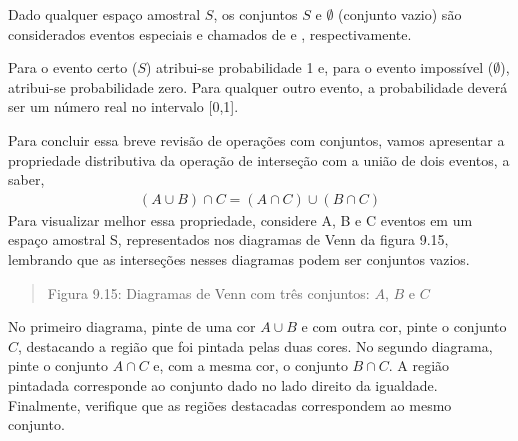Dado qualquer espaço amostral \(S\), os conjuntos \(S\) e \(\emptyset\) (conjunto vazio) são considerados eventos especiais e chamados de  e , respectivamente.

Para o evento certo (\(S\)) atribui-se probabilidade 1 e, para o evento impossível (\(\emptyset\)), atribui-se probabilidade zero. Para qualquer outro evento, a probabilidade deverá ser um número real no intervalo {[}0,1{]}.

Para concluir essa breve revisão de operações com conjuntos, vamos apresentar a propriedade distributiva da operação de interseção com a união de dois eventos, a saber,
\begin{equation*}
\begin{split}(A\cup B)\cap C=(A\cap C)\cup (B\cap C)\end{split}
\end{equation*}
Para visualizar melhor essa propriedade, considere A, B e C eventos em um espaço amostral S, representados nos diagramas de Venn da figura 9.15, lembrando que as interseções nesses diagramas podem ser conjuntos vazios.
\begin{quote}
\begin{center}\end{center}\begin{center}\end{center}
Figura 9.15: Diagramas de Venn com três conjuntos: \(A\), \(B\)  e \(C\)
\end{quote}

No primeiro diagrama, pinte de uma cor \(A\cup B\) e com outra cor, pinte o conjunto \(C\), destacando a região que foi pintada pelas duas cores. No segundo diagrama, pinte o conjunto \(A\cap C\) e, com a mesma cor,  o conjunto \(B\cap C\). A região pintadada corresponde ao conjunto dado no lado direito da igualdade. Finalmente, verifique que as regiões destacadas correspondem ao mesmo conjunto.

